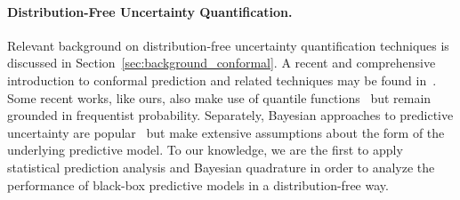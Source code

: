 \paragraph{Distribution-Free Uncertainty Quantification.}
Relevant background on distribution-free uncertainty quantification techniques is discussed in Section~\ref{sec:background_conformal}. A recent and comprehensive introduction to conformal prediction and related techniques may be found in~\citep{angelopoulos2023conformal}. Some recent works, like ours, also make use of quantile functions~\citep{snell2023quantile,farzaneh2024quantile} but remain grounded in frequentist probability.  Separately, Bayesian approaches to predictive uncertainty are popular~\citep{hobbhahn2022fast} but make extensive assumptions about the form of the underlying predictive model. To our knowledge, we are the first to apply statistical prediction analysis and Bayesian quadrature in order to analyze the performance of black-box predictive models in a distribution-free way.